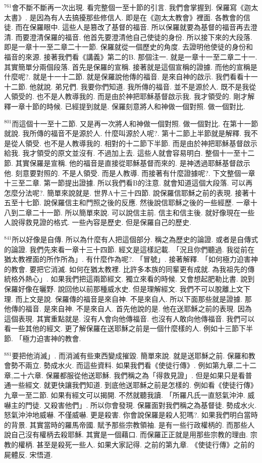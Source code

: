 \documentclass{book}
\begin{document}
$^{761}$會不斷不斷再一次出現.
看完整個一至十節的引言.
我們會掌握到.
保羅寫《迦太太書》.
是因為有人去搞擾那些修信人.
即是在《迦太太教會》裡面.
各教會的信徒.
而在保羅眼中.
這些人是篡改了基督的福音.
所以保羅就要為基督的福音再去澄清.
而要澄清保羅的福音.
他首先要澄清他自己使徒的身份.
所以接下來的大段落.
即是一章十一至二章二十一節.
保羅就從一個歷史的角度.
去證明他使徒的身份和福音的來源.
接著我們看《講義》第二的B.
那個注一.
就是一章十一至二章二十一.
其實簡單分兩個段落.
首先是保羅的宣稱.
接著就是這個宣稱的證據.
而他的宣稱是什麼呢?.
就是十一十二節.
就是保羅說他傳的福音.
是來自神的啟示.
我們看看十一十二節.
他就說.
弟兄們.
我要你們知道.
我所傳的福音.
並不是源於人.
既不是我從人領受的.
也不是人教導我的.
而是由於神把耶穌基督啟示我.
我才領受的.
剛才解釋一章十節的時候.
已經提到就是.
保羅刻意將人和神做一個對照.
做一個對比.

$^{801}$而這個十一至十二節.
又是再一次將人和神做一個對照.
做一個對比.
在第十一節就說.
我所傳的福音不是源於人.
什麼叫源於人呢?.
第十二節上半節就是解釋.
我不是從人領受.
也不是人教導我的.
相對的十二節下半節.
而是由於神把耶穌基督啟示給我.
我才領受的原文並沒有.
不過加上去.
這些人就會容易明白.
整個十一至十二節.
其實保羅是宣稱.
他的福音是直接從耶穌基督而來的.
是神透過耶穌基督啟示他.
刻意要對照的.
不是人領受.
而是人教導.
而接著有什麼證據呢?.
下文整個一章十三至二章.
第一節提出證據.
所以我們看B的注意.
就會知道這個大段落.
可以再怎麼分法呢?.
簡單來說就是.
世界A十三十四節.
說保羅信耶穌之前的表現.
接著十五至十七節.
說保羅信主和門照之後的反應.
然後說信耶穌之後的一些經歷.
一章十八到二章二十一節.
所以簡單來說.
可以說信主前.
信主和信主後.
就好像現在一些人說得救見證的格式.
一些內容是歷史.
但是保羅自己的歷史.

$^{841}$所以好像是自傳.
所以為什麼有人把這個部分.
稱之為歷史的論證.
或者是自傳式的論證.
我們先來看一章十三十四節.
經文是這樣記載.
「況且你們聽過.
我從前在猶太教裡面的所作所為」.
有什麼作為呢?.
「冒號」.
接著解釋.
「如何極力迫害神的教會.
要把它消滅.
如何在猶太教裡.
比許多本族的同輩更有成就.
為我祖先的傳統格外熱心」.
如果我們把這兩節經文.
獨立來看的時候.
又會想起肥勒比書.
說到保羅好像在曬野.
說回他以前那種威水史.
但是理解經文.
我們不可以脫離上文下理.
而上文是說.
保羅傳的福音是來自神.
不是來自人.
所以下面那些就是證據.
那他傳的福音.
是來自神.
不是來自人.
首先他說的是.
他在送耶穌之前的表現.
因為這個表現.
其實重點就是.
沒有人會向他傳福音.
也沒有人敢向他傳福音.
我們可以看一些其他的經文.
更了解保羅在送耶穌之前是一個什麼樣的人.
例如十三節下半節.
「極力迫害神的教會.

$^{881}$要把他消滅」.
而消滅有些東西變成摧毀.
簡單來說.
就是送耶穌之前.
保羅和教會勢不兩立.
勢成水火.
而這些資料.
如果我們看《使徒行傳》.
例如第九章,二十二章,二十六章.
保羅都服從他送耶穌.
我們稱之為「得救見證」.
但是如果只是看普通一些經文.
就更快讓我們知道.
到底他送耶穌之前是怎樣的.
例如看《使徒行傳》九章一至二節.
如果有經文可以揭開.
不然就聽我讀.
「所羅凡氏一直怒氣沖沖.
威嚇主的門徒.
又殺害他們」.
所以你會發現.
保羅面對我們稱之為基督徒.
勢成水火.
怒氣沖沖地威嚇.
不僅威嚇.
更是殺害.
你會說保羅是殺人犯嗎?.
如果我們明白當時的背景.
其實當時的羅馬帝國.
賦予那些宗教領袖.
是有一些行政權柄的.
而那些人說自己沒有權柄去殺耶穌.
其實是一個藉口.
而保羅正正就是用那些宗教的理由.
宗教的權柄.
甚至是殺死一些人.
如果大家記得.
之前的第九章.
《使徒行傳》之前的屍體反.
宋悟道.
\end{document}
